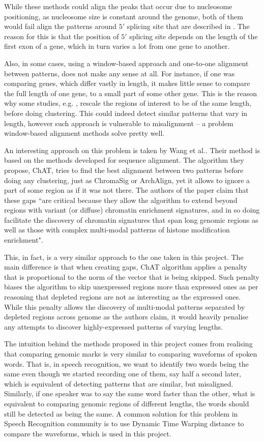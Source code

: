 \documentclass[parskip]{cs4rep}
\begin{document}
While these methods could align the peaks that occur due to nucleosome positioning, as nucleosome size is constant around the genome, both of them would fail align the patterns around $5'$ splicing site that are described in \cite{Bieberstein:2012tf}. The reason for this is that the position of $5'$ splicing site depends on the length of the first exon of a gene, which in turn varies a lot from one gene to another. 

Also, in some cases, using a window-based approach and one-to-one alignment between patterns, does not make any sense at all. For instance, if one was comparing genes, which differ vastly in length, it makes little sense to compare the full length of one gene, to a small part of some other gene. This is the reason why some studies, e.g. \cite{Taslim:vj}, rescale the regions of interest to be of the same length, before doing clustering. This could indeed detect similar patterns that vary in length, however such approach is vulnerable to misalignment -- a problem window-based alignment methods solve pretty well.

An interesting approach on this problem is taken by Wang et al.\citep{Wang:2012cb}. 
Their method is based on the methods developed for sequence alignment.
The algorithm they propose, ChAT, tries to find the best alignment between two patterns before doing any clustering, just as ChromaSig or ArchAlign, yet it allows to ignore a part of some region as if it was not there. The authors of the paper claim that these gaps ``are critical because they allow the algorithm to extend beyond regions with variant (or diffuse) chromatin enrichment signatures, and in so doing facilitate the discovery of chromatin signatures that span long genomic regions as well as those with complex multi-modal patterns of histone modification enrichment". 

This, in fact, is a very similar approach to the one taken in this project. The main difference is that when creating gaps, ChAT algorithm applies a penalty that is proportional to the norm of the vector that is being skipped. Such penalty biases the algorithm to skip unexpressed regions more than expressed ones as per reasoning that depleted regions are not as interesting as the expressed ones. 
While this penalty allows the discovery of multi-modal patterns separated by depleted regions across genome as the authors claim, it would heavily penalise any attempts to discover highly-expressed patterns of varying lengths.

The intuition behind the methods proposed in this project comes from realising that comparing genomic marks is very similar to comparing waveforms of spoken words. That is, in speech recognition, we want to identify two words being the same even though we started recording one of them, say half a second later, which is equivalent of detecting patterns that are similar, but misaligned. Similarly, if one speaker was to say the same word faster than the other, what is equivalent to comparing genomic regions of different lengths, the words should still be detected as being the same. A common solution for this problem in Speech Recognition community is to use Dynamic Time Warping distance to compare the waveforms, which is used in this project.
\end{document}
